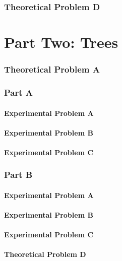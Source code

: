 \subsection*{Theoretical Problem D}

\chapter*{Part Two: Trees}

\subsection*{Theoretical Problem A}

\subsection*{Part A}
\subsubsection*{Experimental Problem A}
\subsubsection*{Experimental Problem B}
\subsubsection*{Experimental Problem C}

\subsection*{Part B}
\subsubsection*{Experimental Problem A}
\subsubsection*{Experimental Problem B}
\subsubsection*{Experimental Problem C}
\subsubsection*{Theoretical Problem D}

